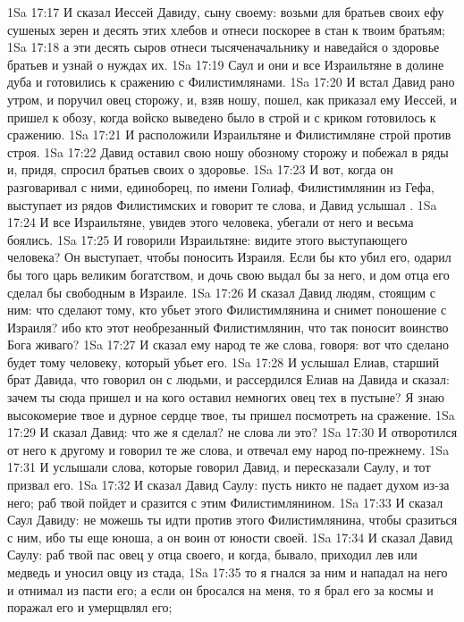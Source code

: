 \vs 1Sa 17:17 И сказал Иессей Давиду, сыну своему: возьми для братьев своих ефу сушеных зерен и десять этих хлебов и отнеси поскорее в стан к твоим братьям;
\vs 1Sa 17:18 а эти десять сыров отнеси тысяченачальнику и наведайся о здоровье братьев и узнай о нуждах их.
\vs 1Sa 17:19 Саул и они и все Израильтяне  в долине дуба и готовились к сражению с Филистимлянами.
\vs 1Sa 17:20 И встал Давид рано утром, и поручил овец сторожу, и, взяв ношу, пошел, как приказал ему Иессей, и пришел к обозу, когда войско выведено было в строй и с криком готовилось к сражению.
\vs 1Sa 17:21 И расположили Израильтяне и Филистимляне строй против строя.
\vs 1Sa 17:22 Давид оставил свою ношу обозному сторожу и побежал в ряды и, придя, спросил братьев своих о здоровье.
\vs 1Sa 17:23 И вот, когда он разговаривал с ними, единоборец, по имени Голиаф, Филистимлянин из Гефа, выступает из рядов Филистимских и говорит те слова, и Давид услышал .
\vs 1Sa 17:24 И все Израильтяне, увидев этого человека, убегали от него и весьма боялись.
\vs 1Sa 17:25 И говорили Израильтяне: видите этого выступающего человека? Он выступает, чтобы поносить Израиля. Если бы кто убил его, одарил бы того царь великим богатством, и дочь свою выдал бы за него, и дом отца его сделал бы свободным в Израиле.
\vs 1Sa 17:26 И сказал Давид людям, стоящим с ним: что сделают тому, кто убьет этого Филистимлянина и снимет поношение с Израиля? ибо кто этот необрезанный Филистимлянин, что так поносит воинство Бога живаго?
\vs 1Sa 17:27 И сказал ему народ те же слова, говоря: вот что сделано будет тому человеку, который убьет его.
\vs 1Sa 17:28 И услышал Елиав, старший брат Давида, что говорил он с людьми, и рассердился Елиав на Давида и сказал: зачем ты сюда пришел и на кого оставил немногих овец тех в пустыне? Я знаю высокомерие твое и дурное сердце твое, ты пришел посмотреть на сражение.
\vs 1Sa 17:29 И сказал Давид: что же я сделал? не слова ли это?
\vs 1Sa 17:30 И отворотился от него к другому и говорил те же слова, и отвечал ему народ по-прежнему.
\vs 1Sa 17:31 И услышали слова, которые говорил Давид, и пересказали Саулу, и тот призвал его.
\vs 1Sa 17:32 И сказал Давид Саулу: пусть никто не падает духом из-за него; раб твой пойдет и сразится с этим Филистимлянином.
\vs 1Sa 17:33 И сказал Саул Давиду: не можешь ты идти против этого Филистимлянина, чтобы сразиться с ним, ибо ты еще юноша, а он воин от юности своей.
\vs 1Sa 17:34 И сказал Давид Саулу: раб твой пас овец у отца своего, и когда, бывало, приходил лев или медведь и уносил овцу из стада,
\vs 1Sa 17:35 то я гнался за ним и нападал на него и отнимал из пасти его; а если он бросался на меня, то я брал его за космы и поражал его и умерщвлял его;
